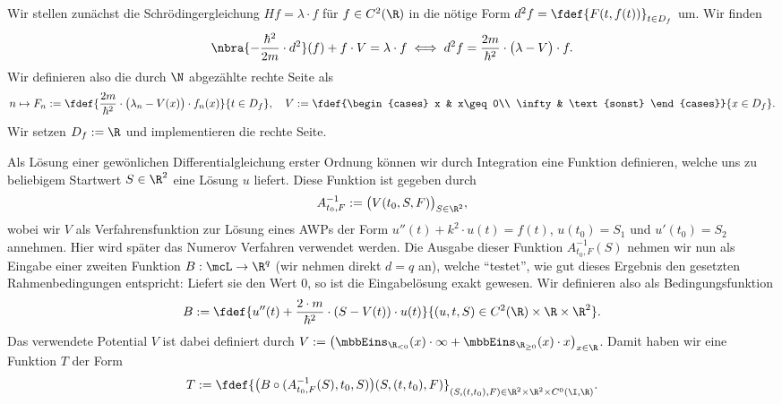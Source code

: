 \documentclass[
    oneside,
    ngerman,
    footinclude=false,
    captions=tableheading,
    DIV=12
]{scrartcl}
\begin{document}
    \aufgabe{}
        \subaufgabe{}
            Wir stellen zunächst die Schrödingergleichung $Hf = \lambda\cdot f$ für $f\in C^2(\R)$ in die nötige Form $d^2f = \fdef{F(t,f(t))}_{t\in D_f}$ um. Wir finden 
            \begin{align*}
                \nbra{-\frac{\hbar^2}{2m}\cdot d^2}(f) + f\cdot V = \lambda\cdot f\iff d^2f = \frac{2m}{\hbar^2}\cdot\big(\lambda - V\big)\cdot f.
            \end{align*}
            Wir definieren also die durch $\N$ abgezählte rechte Seite als
            \[
                n\mapsto F_n:=\fdef{\frac{2m}{\hbar^2}\cdot\big(\lambda_n - V(x)\big)\cdot f_n(x)}{t\in D_f},\quad V:=\fdef{\begin{cases}
                    x & x\geq 0\\
                    \infty & \text{sonst}
                \end{cases}}{x\in D_f}.
            \]
            Wir setzen $D_f:=\R$ und implementieren die rechte Seite.

    \aufgabe{}
        Als Lösung einer gewönlichen Differentialgleichung erster Ordnung können wir durch Integration eine Funktion definieren, welche uns zu beliebigem Startwert $S\in\R^2$ eine Lösung $u$ liefert. Diese Funktion ist gegeben durch
        \begin{align*}
            A^{-1}_{t_0,F}:=\bigl(V(t_0,S,F)\bigr)_{S\in\R^2},
        \end{align*}
        wobei wir $V$ als Verfahrensfunktion zur Lösung eines AWPs der Form $u''(t) + k^2\cdot u(t) = f(t)$, $u(t_0) = S_1$ und $u'(t_0) = S_2$ annehmen. Hier wird später das Numerov Verfahren verwendet werden. Die Ausgabe dieser Funktion $A^{-1}_{t_0,F}(S) $ nehmen wir nun als Eingabe einer zweiten Funktion $B:\mcL\to\R^q$ (wir nehmen direkt $d = q$ an), welche \enquote{testet}, wie gut dieses Ergebnis den gesetzten Rahmenbedingungen entspricht: Liefert sie den Wert $0$, so ist die Eingabelösung exakt gewesen. Wir definieren also als Bedingungsfunktion
        \[
            B:=\fdef{u''(t) + \frac{2\cdot m}{\hbar^2}\cdot(S - V(t))\cdot u(t)}{(u,t,S)\in C^2(\R)\times\R\times\R^2}.
        \]
        Das verwendete Potential $V$ ist dabei definiert durch $V := \bigl(\mbbEins_{\R_{<0}}(x)\cdot\infty + \mbbEins_{\R_{\geq 0}}(x)\cdot x\bigr)_{x\in\R}$. Damit haben wir eine Funktion $T$ der Form 
        \[
            T:=\fdef{\bigl(B\circ (A^{-1}_{t_0,F}(S),t_0,S)\bigr)(S,(t,t_0),F)}_{(S,(t,t_0),F)\in\R^2\times\R^2\times C^0(\I,\R)}.
        \]
            
\end{document}

